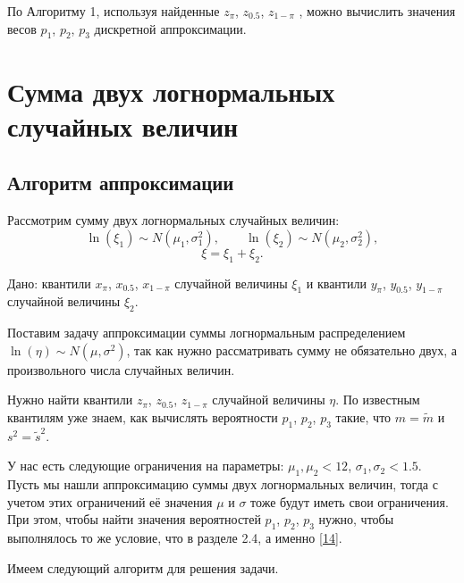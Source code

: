 \documentclass[specialist, substylefile = spbu.rtx,
subf,href,colorlinks=true, 12pt]{disser}
\begin{document}
	По Алгоритму 1, используя найденные $z_{\pi}$, $z_{0.5}$, $z_{1-\pi}$ , можно вычислить значения весов $p_{1}$, $p_{2}$, $p_{3}$ дискретной аппроксимации.
	
	\chapter{Сумма двух логнормальных случайных величин}
	\section{Алгоритм аппроксимации}
	
	Рассмотрим сумму двух логнормальных случайных величин:
\begin{equation*}
	\ln(\xi_{1}) \sim N(\mu_{1}, \sigma _{1}^{2}), \quad\quad \ln(\xi_{2}) \sim N(\mu_{2}, \sigma _{2}^{2}),
\end{equation*}
\begin{equation*}
	\xi = \xi_{1}+\xi_{2}.
\end{equation*}

Дано: квантили $x_{\pi}$, $x_{0.5}$, $x_{1-\pi}$ случайной величины $\xi_1$ и  квантили $y_{\pi}$, $y_{0.5}$, $y_{1-\pi}$ случайной величины $\xi_2$.

Поставим задачу аппроксимации суммы логнормальным распределением $\ln(\eta) \sim N(\mu, \sigma^{2})$, так как нужно рассматривать сумму не обязательно двух, а произвольного числа случайных величин.

Нужно найти квантили $z_{\pi}$, $z_{0.5}$, $z_{1-\pi}$ случайной величины $\eta$. По известным квантилям уже знаем, как вычислять вероятности $p_{1}$, $p_{2}$, $p_{3}$ такие, что $m = \tilde{m}$  и $s^{2} = \tilde{s}^{2}$.

У нас есть следующие ограничения на параметры: $\mu_{1}, \mu_{2} < 12$, $\sigma_{1}, \sigma_{2} < 1.5$. Пусть мы нашли аппроксимацию суммы двух логнормальных величин, тогда с учетом этих ограничений её значения $\mu$ и $\sigma$ тоже будут иметь свои ограничения. При этом, чтобы найти значения вероятностей $p_{1}$, $p_{2}$, $p_{3}$ нужно, чтобы выполнялось то же условие, что в разделе 2.4, а именно \eqref{14}.

Имеем следующий алгоритм для решения задачи.
\end{document}
